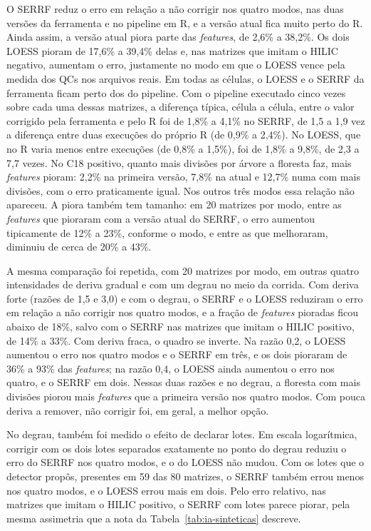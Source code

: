 O SERRF reduz o erro em relação a não corrigir nos quatro modos, nas duas versões da ferramenta e no pipeline em R, e a versão atual fica muito perto do R. Ainda assim, a versão atual piora parte das \emph{features}, de 2,6\% a 38,2\%. Os dois LOESS pioram de 17,6\% a 39,4\% delas e, nas matrizes que imitam o HILIC negativo, aumentam o erro, justamente no modo em que o LOESS vence pela medida dos QCs nos arquivos reais. Em todas as células, o LOESS e o SERRF da ferramenta ficam perto dos do pipeline. Com o pipeline executado cinco vezes sobre cada uma dessas matrizes, a diferença típica, célula a célula, entre o valor corrigido pela ferramenta e pelo R foi de 1,8\% a 4,1\% no SERRF, de 1,5 a 1,9 vez a diferença entre duas execuções do próprio R (de 0,9\% a 2,4\%). No LOESS, que no R varia menos entre execuções (de 0,8\% a 1,5\%), foi de 1,8\% a 9,8\%, de 2,3 a 7,7 vezes. No C18 positivo, quanto mais divisões por árvore a floresta faz, mais \emph{features} pioram: 2,2\% na primeira versão, 7,8\% na atual e 12,7\% numa com mais divisões, com o erro praticamente igual. Nos outros três modos essa relação não apareceu. A piora também tem tamanho: em 20 matrizes por modo, entre as \emph{features} que pioraram com a versão atual do SERRF, o erro aumentou tipicamente de 12\% a 23\%, conforme o modo, e entre as que melhoraram, diminuiu de cerca de 20\% a 43\%.

A mesma comparação foi repetida, com 20 matrizes por modo, em outras quatro intensidades de deriva gradual e com um degrau no meio da corrida. Com deriva forte (razões de 1,5 e 3,0) e com o degrau, o SERRF e o LOESS reduziram o erro em relação a não corrigir nos quatro modos, e a fração de \emph{features} pioradas ficou abaixo de 18\%, salvo com o SERRF nas matrizes que imitam o HILIC positivo, de 14\% a 33\%. Com deriva fraca, o quadro se inverte. Na razão 0,2, o LOESS aumentou o erro nos quatro modos e o SERRF em três, e os dois pioraram de 36\% a 93\% das \emph{features}; na razão 0,4, o LOESS ainda aumentou o erro nos quatro, e o SERRF em dois. Nessas duas razões e no degrau, a floresta com mais divisões piorou mais \emph{features} que a primeira versão nos quatro modos. Com pouca deriva a remover, não corrigir foi, em geral, a melhor opção.

No degrau, também foi medido o efeito de declarar lotes. Em escala logarítmica, corrigir com os dois lotes separados exatamente no ponto do degrau reduziu o erro do SERRF nos quatro modos, e o do LOESS não mudou. Com os lotes que o detector propôs, presentes em 59 das 80 matrizes, o SERRF também errou menos nos quatro modos, e o LOESS errou mais em dois. Pelo erro relativo, nas matrizes que imitam o HILIC positivo, o SERRF com lotes parece piorar, pela mesma assimetria que a nota da Tabela~\ref{tab:ia-sinteticas} descreve.

